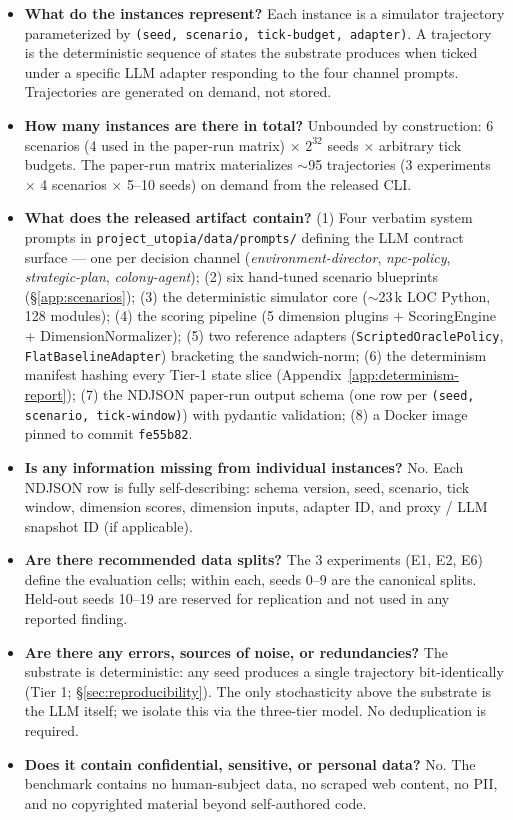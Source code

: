 \begin{itemize}[leftmargin=*]
\item \textbf{What do the instances represent?}
Each instance is a simulator trajectory parameterized by
\texttt{(seed, scenario, tick-budget, adapter)}. A trajectory is
the deterministic sequence of states the substrate produces when
ticked under a specific LLM adapter responding to the four channel
prompts. Trajectories are generated on demand, not stored.
\item \textbf{How many instances are there in total?}
Unbounded by construction: 6 scenarios (4 used in the paper-run
matrix) $\times$ $2^{32}$ seeds $\times$ arbitrary tick budgets.
The paper-run matrix materializes $\sim$95 trajectories
(3 experiments $\times$ 4 scenarios $\times$ 5--10 seeds) on
demand from the released CLI.
\item \textbf{What does the released artifact contain?}
(1) Four verbatim system prompts in \texttt{project\_utopia/data/prompts/}
defining the LLM contract surface --- one per decision channel
(\emph{environment-director}, \emph{npc-policy},
\emph{strategic-plan}, \emph{colony-agent});
(2) six hand-tuned scenario blueprints (\S\ref{app:scenarios});
(3) the deterministic simulator core
($\sim$23\,k LOC Python, 128 modules);
(4) the scoring pipeline (5 dimension plugins + ScoringEngine +
DimensionNormalizer);
(5) two reference adapters (\texttt{ScriptedOraclePolicy},
\texttt{FlatBaselineAdapter}) bracketing the sandwich-norm;
(6) the determinism manifest hashing every Tier-1 state
slice (Appendix~\ref{app:determinism-report});
(7) the NDJSON paper-run output schema (one row per
\texttt{(seed, scenario, tick-window)}) with pydantic validation;
(8) a Docker image pinned to commit
\texttt{fe55b82}.
\item \textbf{Is any information missing from individual
instances?}
No. Each NDJSON row is fully self-describing: schema version,
seed, scenario, tick window, dimension scores, dimension
inputs, adapter ID, and proxy / LLM snapshot ID (if applicable).
\item \textbf{Are there recommended data splits?}
The 3 experiments (E1, E2, E6) define the evaluation cells;
within each, seeds 0--9 are the canonical splits. Held-out seeds
10--19 are reserved for replication and not used in any reported
finding.
\item \textbf{Are there any errors, sources of noise, or
redundancies?}
The substrate is deterministic: any seed produces a single
trajectory bit-identically (Tier 1; \S\ref{sec:reproducibility}).
The only stochasticity above the substrate is the LLM itself; we
isolate this via the three-tier model. No deduplication is
required.
\item \textbf{Does it contain confidential, sensitive, or
personal data?}
No. The benchmark contains no human-subject data, no scraped
web content, no PII, and no copyrighted material beyond
self-authored code.
\end{itemize}

